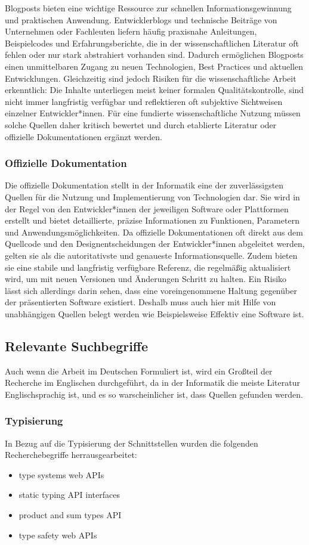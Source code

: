 Blogposts bieten eine wichtige Ressource zur schnellen Informationsgewinnung und praktischen Anwendung. 
Entwicklerblogs und technische Beiträge von Unternehmen oder Fachleuten liefern häufig praxisnahe Anleitungen,
Beispielcodes und Erfahrungsberichte, die in der wissenschaftlichen Literatur oft fehlen oder nur stark abstrahiert vorhanden sind. 
Dadurch ermöglichen Blogposts einen unmittelbaren Zugang zu neuen Technologien, Best Practices und aktuellen Entwicklungen.
Gleichzeitig sind jedoch Risiken für die wissenschaftliche Arbeit erkenntlich:
Die Inhalte unterliegen meist keiner formalen Qualitätskontrolle, sind nicht immer langfristig verfügbar und 
reflektieren oft subjektive Sichtweisen einzelner Entwickler*innen.
Für eine fundierte wissenschaftliche Nutzung müssen solche Quellen daher kritisch bewertet und 
durch etablierte Literatur oder offizielle Dokumentationen ergänzt werden.

\subsubsection{Offizielle Dokumentation}

Die offizielle Dokumentation stellt in der Informatik eine der zuverlässigsten Quellen für die Nutzung und Implementierung 
von Technologien dar.
Sie wird in der Regel von den Entwickler*innen der jeweiligen Software oder Plattformen erstellt und bietet detaillierte, 
präzise Informationen zu Funktionen, Parametern und Anwendungsmöglichkeiten. 
Da offizielle Dokumentationen oft direkt aus dem Quellcode und den Designentscheidungen der Entwickler*innen abgeleitet werden, 
gelten sie als die autoritativste und genaueste Informationsquelle.
Zudem bieten sie eine stabile und langfristig verfügbare Referenz,
die regelmäßig aktualisiert wird, um mit neuen Versionen und Änderungen Schritt zu halten.
Ein Risiko lässt sich allerdings darin sehen, dass eine voreingenommene Haltung gegenüber der präsentierten Software existiert.
Deshalb muss auch hier mit Hilfe von unabhängigen Quellen belegt werden wie Beispielsweise Effektiv eine Software ist.

\subsection{Relevante Suchbegriffe}

Auch wenn die Arbeit im Deutschen Formuliert ist, wird ein Großteil der Recherche im Englischen
durchgeführt, da in der Informatik die meiste Literatur Englischsprachig ist, und es so warscheinlicher ist,
dass Quellen gefunden werden.

\subsubsection{Typisierung}

In Bezug auf die Typisierung der Schnittstellen wurden die folgenden
Recherchebegriffe herrausgearbeitet:

\begin{itemize}
\item type systems web APIs
\item static typing API interfaces
\item product and sum types API
\item type safety web APIs
\end{itemize}


